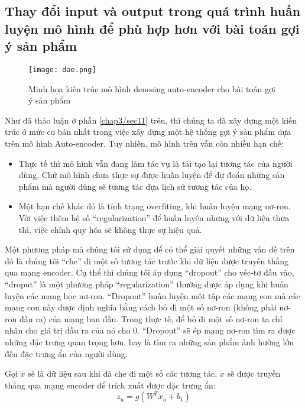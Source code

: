     \subsection{Thay đổi input và output trong quá trình huấn luyện mô hình để phù hợp hơn với bài toán gợi ý sản phẩm}
    \label{DAE_recsys}
    \begin{figure}
        \centering
        \texttt{[image: dae.png]}
        \caption{Minh họa kiến trúc mô hình denosing auto-encoder cho bài toán gợi ý sản phẩm}
        \label{fig_recdae}
    \end{figure}
    Như đã thảo luận ở phần \ref{chap3/sec11} trên, thì chúng ta đã xây dựng một kiến trúc ở mức cơ bản nhất trong việc xây dựng một hệ thống gợi ý sản phẩm dựa trên mô hình Auto-encoder.
    Tuy nhiên, mô hình trên vẫn còn nhiều hạn chế: 
    \begin{itemize}
        \item Thực tế thì mô hình vẫn đang làm tác vụ là tái tạo lại tương tác của người dùng. Chứ mô hình chưa thực sự được huấn luyện để dự đoán những sản phẩm mà người dùng sẽ tương tác dựa lịch sử tương tác của họ.
        \item Một hạn chế khác đó là tính trạng overfiting, khi huấn luyện mạng nơ-ron. Với việc thêm hệ số ``regularization'' để huấn luyện nhưng với dữ liệu thưa thì, việc chính quy hóa sẽ không thực sự hiệu quả.
    \end{itemize}
    
    Một phương pháp mà chúng tôi sử dụng để có thể giải quyết những vấn đề trên đó là chúng tôi ``che'' đi một số tương tác trước khi dữ liệu được truyền thẳng qua mạng encoder. 
    Cụ thể thì chúng tôi áp dụng ``dropout'' cho véc-tơ đầu vào, ``droput'' là một phương pháp ``regularization'' thường được áp dụng khi huấn luyện các mạng học nơ-ron.
    ``Dropout'' huấn luyện một tập các mạng con mà các mạng con này được định nghĩa bằng cách bỏ đi một số nơ-ron (không phải nơ-ron đầu ra) của mạng ban đầu. 
    Trong thực tế, để bỏ đi một số nơ-ron ta chỉ nhân cho giá trị đầu ra của nó cho 0. 
    ``Dropout'' sẽ ép mạng nơ-ron tìm ra được những đặc trưng quan trọng hơn, hay là tìm ra những sản phẩm ảnh hưởng lớn đến đặc trưng ẩn của người dùng. 
    
    Gọi $\tilde{x}$ sẽ là dữ liệu sau khi đã che đi một số các tương tác, $\tilde{x}$ sẽ được truyền thẳng qua mạng encoder để trích xuất được đặc trưng ẩn:
    \begin{equation}
        \label{z_u_with_x_tilde}
        z_u = g(W^T \tilde{x}_u + b_1)
    \end{equation}
    
